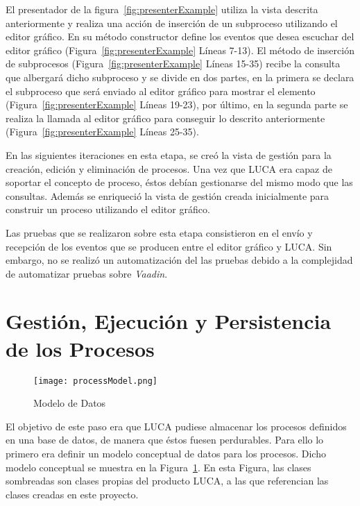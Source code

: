 El presentador de la figura~\ref{fig:presenterExample} utiliza la vista descrita anteriormente y realiza una acción de inserción de un subproceso utilizando el editor gráfico. En su método constructor define los eventos que desea escuchar del editor gráfico (Figura~\ref{fig:presenterExample} Líneas 7-13). El método de inserción de subprocesos (Figura~\ref{fig:presenterExample} Líneas 15-35) recibe la consulta que albergará dicho subproceso y se divide en dos partes, en la primera se declara el subproceso que será enviado al editor gráfico para mostrar el elemento (Figura~\ref{fig:presenterExample} Líneas 19-23), por último, en la segunda parte se realiza la llamada al editor gráfico para conseguir lo descrito anteriormente (Figura~\ref{fig:presenterExample} Líneas 25-35).

En las siguientes iteraciones en esta etapa, se creó la vista de gestión para la creación, edición y eliminación de procesos. Una vez que LUCA era capaz de soportar el concepto de proceso, éstos debían gestionarse del mismo modo que las consultas. Además se enriqueció la vista de gestión creada inicialmente para construir un proceso utilizando el editor gráfico.

Las pruebas que se realizaron sobre esta etapa consistieron en el envío y recepción de los eventos que se producen entre el editor gráfico y LUCA. Sin embargo, no se realizó un automatización del las pruebas debido a la complejidad de automatizar pruebas sobre \emph{Vaadin}.

\section{Gestión, Ejecución y Persistencia de los Procesos}

\begin{figure}[H]
	\centering
	\hspace*{-3.5cm}\texttt{[image: processModel.png]}
	\caption{Modelo de Datos}
	\label{fig:processModel}
\end{figure}

El objetivo de este paso era que LUCA pudiese almacenar los procesos definidos en una base de datos, de manera que éstos fuesen perdurables. Para ello lo primero era definir un modelo conceptual de datos para los procesos. Dicho modelo conceptual se muestra en la Figura~\ref{fig:processModel}. En esta Figura, las clases sombreadas son clases propias del producto LUCA, a las que referencian las clases creadas  en este proyecto.

